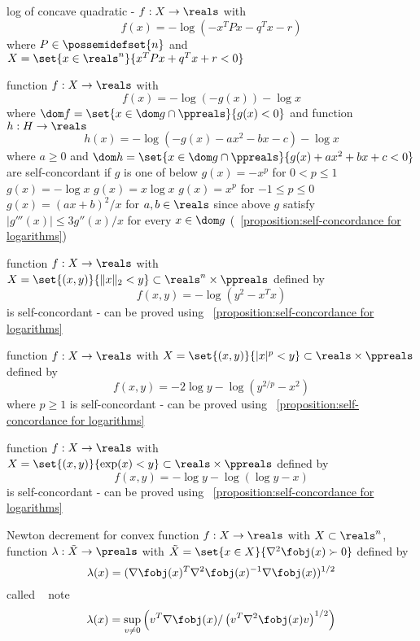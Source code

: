 \documentclass[17pt,landscape]{foils}
\begin{document}
{\vitem
	log of concave quadratic
	-
	$f:X\to\reals$
	with
	$$
		f(x) = -\log(-x^TPx - q^Tx - r)
	$$
	where
		$P\in\possemidefset{n}$
	and
		$X=\set{x\in\reals^n}{x^TPx + q^Tx + r<0}$

\vitem
	function $f:X\to\reals$
	with
	$$
		f(x) = -\log(-g(x)) - \log x
	$$
	where $\dom f = \set{x\in\dom g \cap \ppreals}{g(x)<0}$
	and
	function $h:H\to\reals$
	$$
		h(x) = -\log(-g(x)-ax^2-bx-c) - \log x
	$$
	where $a\geq0$ and $\dom h = \set{x\in\dom g \cap \ppreals}{g(x)+ax^2+bx+c<0}$
	are self-concordant
	if $g$ is one of below
	\bit
	\vitem
		$g(x) = -x^p$ for $0<p\leq 1$
	\vitem
		$g(x) = -\log x$
	\vitem
		$g(x) = x \log x$
	\vitem
		$g(x) = x^p$ for $-1\leq p\leq 0$
	\vitem
		$g(x) = (ax+b)^2/x$ for $a,b\in\reals$
	\eit
	since above $g$ satisfy
	$|g'''(x)| \leq 3 g''(x)/x$
	for every $x\in\dom g$
	(\propositionname~\ref{proposition:self-concordance for logarithms})

\vitem
	function $f:X\to\reals$
	with $X = \set{(x,y)}{\|x\|_2 < y}\subset \reals^n \times \ppreals$
	defined by
	$$
		f(x,y) = -\log(y^2-x^Tx)
	$$
	is self-concordant - can be proved using \propositionname~\ref{proposition:self-concordance for logarithms}\

\vitem
	function $f:X\to\reals$
	with $X = \set{(x,y)}{|x|^p < y}\subset \reals \times \ppreals$
	defined by
	$$
		f(x,y) = -2\log y - \log(y^{2/p}- x^2)
	$$
	where $p\geq1$
	is self-concordant - can be proved using \propositionname~\ref{proposition:self-concordance for logarithms}\

\vitem
	function $f:X\to\reals$
	with $X = \set{(x,y)}{\exp(x) < y}\subset \reals \times \ppreals$
	defined by
	$$
		f(x,y) = -\log y - \log(\log y - x)
	$$
	is self-concordant - can be proved using \propositionname~\ref{proposition:self-concordance for logarithms}\
\eit



\begin{mydefinition}{Newton decrement}
	for convex function $f:X\to\reals$ with $X\subset \reals^n$,
	function $\lambda:\tilde{X}\to\preals$
	with $\tilde{X} = \set{x\in X}{\nabla^2 \fobj(x) \succ 0}$
	defined by
	$$
		\lambda(x) = (\nabla \fobj(x)^T \nabla^2 \fobj(x)^{-1} \nabla \fobj(x))^{1/2}
	$$
	called 
	\shrinkspacewithintheoremslike\
	\ibit
	\iitem
		note
		$$
			\lambda(x)
			=
			\sup_{v\neq 0}
			\left(v^T \nabla \fobj(x) / \left( v^T \nabla^2 \fobj(x) v \right)^{1/2} \right)
		$$
	\eit
\end{mydefinition}
%
%

}
\end{document}
